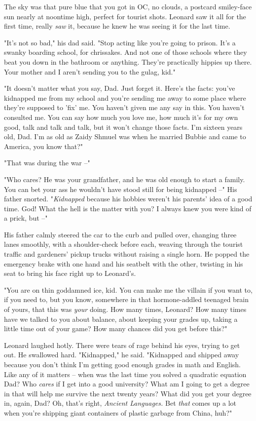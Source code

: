 The sky was that pure blue that you got in OC, no clouds, a
postcard smiley-face sun nearly at noontime high, perfect for
tourist shots. Leonard saw it all for the first time, really
\emph{saw} it, because he knew he was seeing it for the last time.

"It's not so bad," his dad said. "Stop acting like you're going to
prison. It's a swanky boarding school, for chrissakes. And not one
of those schools where they beat you down in the bathroom or
anything. They're practically hippies up there. Your mother and I
aren't sending you to the gulag, kid."

"It doesn't matter what you say, Dad. Just forget it. Here's the
facts: you've kidnapped me from my school and you're sending me
away to some place where they're supposed to 'fix' me. You haven't
given me any say in this. You haven't consulted me. You can say how
much you love me, how much it's for my own good, talk and talk and
talk, but it won't change those facts. I'm sixteen years old, Dad.
I'm as old as Zaidy Shmuel was when he married Bubbie and came to
America, you know that?"

"That was during the war --"

"Who cares? He was your grandfather, and he was old enough to start
a family. You can bet your ass he wouldn't have stood still for
being kidnapped --" His father snorted. "\emph{Kidnapped} because
his hobbies weren't his parents' idea of a good time. God! What the
hell is the matter with you? I always knew you were kind of a
prick, but --"

His father calmly steered the car to the curb and pulled over,
changing three lanes smoothly, with a shoulder-check before each,
weaving through the tourist traffic and gardeners' pickup trucks
without raising a single horn. He popped the emergency brake with
one hand and his seatbelt with the other, twisting in his seat to
bring his face right up to Leonard's.

"You are on thin goddamned ice, kid. You can make me the villain if
you want to, if you need to, but you know, somewhere in that
hormone-addled teenaged brain of yours, that this was \emph{your}
doing. How many times, Leonard? How many times have we talked to
you about balance, about keeping your grades up, taking a little
time out of your game? How many chances did you get before this?"

Leonard laughed hotly. There were tears of rage behind his eyes,
trying to get out. He swallowed hard. "Kidnapped," he said.
"Kidnapped and shipped away because you don't think I'm getting
good enough grades in math and English. Like any of it matters --
when was the last time you solved a quadratic equation Dad? Who
\emph{cares} if I get into a good university? What am I going to
get a degree in that will help me survive the next twenty years?
What did you get your degree in, again, Dad? Oh, that's right,
\emph{Ancient Languages.} Bet \emph{that} comes up a lot when
you're shipping giant containers of plastic garbage from China,
huh?"

